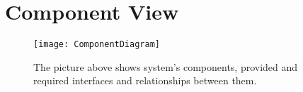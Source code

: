 \section{Component View}

\begin{figure}[H]
	\centering
	\texttt{[image: ComponentDiagram]}
	\caption[Component Diagram]{The picture above shows system's components, provided and required interfaces and relationships between them.}
	\label{fig:ComponentDiagram}
\end{figure}
